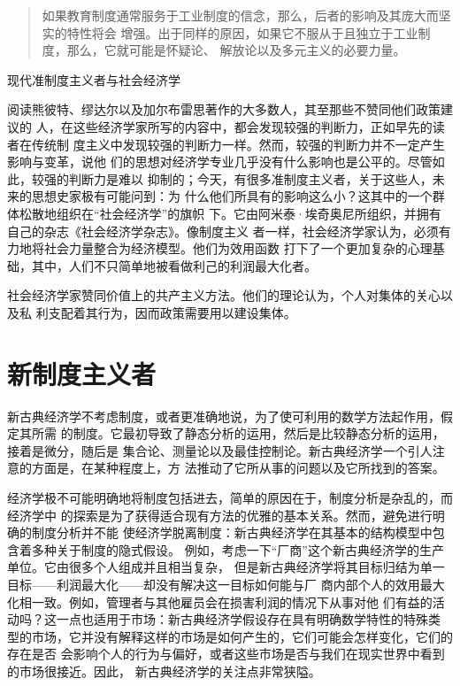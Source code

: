 \begin{quotation}
  如果教育制度通常服务于工业制度的信念，那么，后者的影响及其庞大而坚实的特性将会
  增强。出于同样的原因，如果它不服从于且独立于工业制度，那么，它就可能是怀疑论、
  解放论以及多元主义的必要力量。
\end{quotation}

\begin{mybox}{现代准制度主义者与社会经济学}
  \begin{multicols}{2}
    阅读熊彼特、缪达尔以及加尔布雷思著作的大多数人，其至那些不赞同他们政策建议的
    人，在这些经济学家所写的内容中，都会发现较强的判断力，正如早先的读者在传统制
    度主义中发现较强的判断力一样。然而，较强的判断力并不一定产生影响与变革，说他
    们的思想对经济学专业几乎没有什么影响也是公平的。尽管如此，较强的判断力是难以
    抑制的；今天，有很多准制度主义者，关于这些人，未来的思想史家极有可能问到：为
    什么他们所具有的影响这么小？这其中的一个群体松散地组织在“社会经济学”的旗帜
    下。它由阿米泰·埃奇奥尼所组织，并拥有自己的杂志《社会经济学杂志》。像制度主义
    者一样，社会经济学家认为，必须有力地将社会力量整合为经济模型。他们为效用函数
    打下了一个更加复杂的心理基础，其中，人们不只简单地被看做利己的利润最大化者。

    社会经济学家赞同价值上的共产主义方法。他们的理论认为，个人对集体的关心以及私
    利支配着其行为，因而政策需要用以建设集体。
  \end{multicols}

\end{mybox}

\section{新制度主义者}

新古典经济学不考虑制度，或者更准确地说，为了使可利用的数学方法起作用，假定其所需
的制度。它最初导致了静态分析的运用，然后是比较静态分析的运用，接着是微分，随后是
集合论、测量论以及最佳控制论。新古典经济学一个引人注意的方面是，在某种程度上，方
法推动了它所从事的问题以及它所找到的答案。

经济学极不可能明确地将制度包括进去，简单的原因在于，制度分析是杂乱的，而经济学中
的探索是为了获得适合现有方法的优雅的基本关系。然而，避免进行明确的制度分析并不能
使经济学脱离制度：新古典经济学在其基本的结构模型中包含着多种关于制度的隐式假设。
例如，考虑一下“厂商”这个新古典经济学的生产单位。它由很多个人组成并且相当复杂，
但是新古典经济学将其目标归结为单一目标——利润最大化——却没有解决这一目标如何能与厂
商内部个人的效用最大化相一致。例如，管理者与其他雇员会在损害利润的情况下从事对他
们有益的活动吗？这一点也适用于市场：新古典经济学假设存在具有明确数学特性的特殊类
型的市场，它并没有解释这样的市场是如何产生的，它们可能会怎样变化，它们的存在是否
会影响个人的行为与偏好，或者这些市场是否与我们在现实世界中看到的市场很接近。因此，
新古典经济学的关注点非常狭隘。

